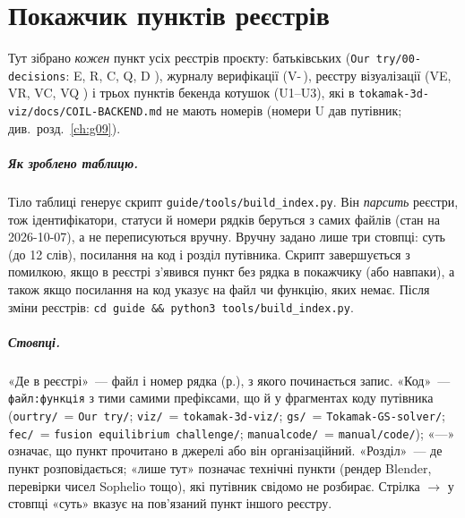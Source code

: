 \chapter{Покажчик пунктів реєстрів}\label{app:index}

Тут зібрано \emph{кожен} пункт усіх реєстрів проєкту: батьківських
(\texttt{Our try/00-decisions}: E, R, C, Q, D \cite{RegEst,RegConj,RegDec,RegQ}), журналу
верифікації (V-\,\cite{RegVerif}), реєстру візуалізації (VE, VR, VC, VQ \cite{RegViz}) і трьох
пунктів бекенда котушок (U1--U3), які в \texttt{tokamak-3d-viz/docs/COIL-BACKEND.md} не мають
номерів (номери U дав путівник; див.\ розд.~\ref{ch:g09}).

\paragraph{Як зроблено таблицю.} Тіло таблиці генерує скрипт
\texttt{guide/tools/build\_index.py}. Він \emph{парсить} реєстри, тож ідентифікатори, статуси
й номери рядків беруться з самих файлів (стан на 2026-10-07), а не переписуються вручну. Вручну
задано лише три стовпці: суть (до 12 слів), посилання на код і розділ путівника. Скрипт
завершується з помилкою, якщо в реєстрі з'явився пункт без рядка в покажчику (або навпаки), а
також якщо посилання на код указує на файл чи функцію, яких немає. Після зміни реєстрів:
\verb|cd guide && python3 tools/build_index.py|.

{\raggedright\paragraph{Стовпці.} «Де в реєстрі»~--- файл і номер рядка (р.), з якого починається запис. «Код»~---
\texttt{файл:функція} з тими самими префіксами, що й у фрагментах коду путівника
(\texttt{ourtry/}~= \texttt{Our try/}; \texttt{viz/}~= \texttt{tokamak-3d-viz/};
\texttt{gs/}~= \texttt{Tokamak-GS-solver/}; \texttt{fec/}~= \texttt{fusion equilibrium
challenge/}; \texttt{manualcode/}~= \texttt{manual/code/}); «---» означає, що пункт прочитано в джерелі або
він організаційний. «Розділ»~--- де пункт розповідається; «лише тут» позначає технічні пункти
(рендер Blender, перевірки чисел Sophelio тощо), які путівник свідомо не розбирає.
Стрілка $\to$ у стовпці «суть» вказує на пов'язаний пункт іншого реєстру.\par}

